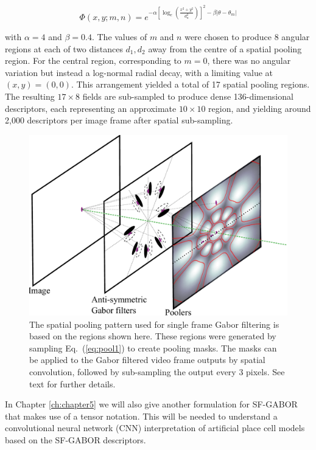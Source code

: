 \begin{equation}
\Phi(x,y;m,n) = e^{-\alpha \left [\log_e \left ( \frac{x^2+y^2}{d_n^2}\right ) \right ]^2 - \beta |\theta-\theta_m | }
\label{eq:pool1}
\end{equation}

\noindent with $\alpha = 4$ and $\beta = 0.4$. The values of $m$ and $n$ were chosen to produce 8 angular regions at each of two distances $d_1, d_2$ away from the centre of a spatial pooling region.  For the central region, corresponding to $m=0$, there was no angular variation but instead a log-normal radial decay, with a limiting value at $(x,y)=(0,0)$. This arrangement yielded a total of  17 spatial pooling regions. The resulting $17 \times 8$ fields are sub-sampled to produce dense 136-dimensional descriptors, each representing an approximate $10 \times 10$ region, and yielding around 2,000 descriptors per image frame after spatial sub-sampling. 

\begin{figure}[t]
\centering
\includegraphics[width=0.7\linewidth]{./gfx/Chapter04/Layers.pdf}
\caption{The spatial pooling pattern used for single frame Gabor filtering is based on the regions shown here.  These regions were generated by sampling Eq.~(\ref{eq:pool1}) to create pooling masks. The masks can be applied to the Gabor filtered video frame outputs by spatial convolution, followed by sub-sampling the output every 3 pixels. See text for further details.}
\label{fig:IsoPool}
\end{figure}

In Chapter \ref{ch:chapter5} we will also give another formulation for SF-GABOR that makes use of a tensor notation. This will be needed to understand a convolutional neural network (CNN) interpretation of artificial place cell models based on the SF-GABOR descriptors.

